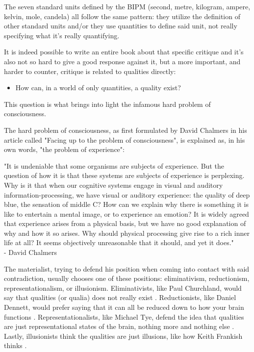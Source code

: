 The seven standard units defined by the BIPM (second, metre, kilogram, ampere, kelvin, mole,
candela) all follow the same pattern: they utilize the definition of other standard units
and/or they use quantities to define said unit, not really specifying what it's really
quantifying.

It is indeed possible to write an entire book about that specific critique and it's also not
so hard to give a good response against it, but a more important, and harder to counter,
critique is related to qualities directly:

\begin{itemize}
    \item How can, in a world of only quantities, a quality exist?
\end{itemize}

This question is what brings into light the infamous hard problem of
consciousness.

The hard problem of consciousness, as first formulated by David Chalmers in his article
called "Facing up to the problem of consciousness", is explained as, in his own words,
"the problem of experience":

\begin{center}
    \itshape
    \parbox{0.7\textwidth}{
    "It is undeniable that some organisms are subjects of experience. But the question of how
    it is that these systems are subjects of experience is perplexing. Why is it that when our
    cognitive systems engage in visual and auditory information-processing, we have visual or
    auditory experience: the quality of deep blue, the sensation of middle C? How can we explain
    why there is something it is like to entertain a mental image, or to experience an emotion? It
    is widely agreed that experience arises from a physical basis, but we have no good
    explanation of why and how it so arises. Why should physical processing give rise to a rich
    inner life at all? It seems objectively unreasonable that it should, and yet it does."\\
    \normalfont - David Chalmers \cite{Chalmers1995}
    }
\end{center}

The materialist, trying to defend his position when coming into contact with said contradiction,
usually chooses one of these positions: eliminativism, reductionism, representationalism, or
illusionism. Eliminativists, like Paul Churchland, would say that qualities (or qualia) does not
really exist \cite{Churchland1981}. Reductionists, like Daniel Dennett, would prefer saying that
it can all be reduced down to how your brain functions \cite{Dennett1991}. Representationalists,
like Michael Tye, defend the idea that qualities are just representational states of the brain,
nothing more and nothing else \cite{Tye1997}. Lastly, illusionists think the qualities are just
illusions, like how Keith Frankish thinks \cite{Frankish2016}.

